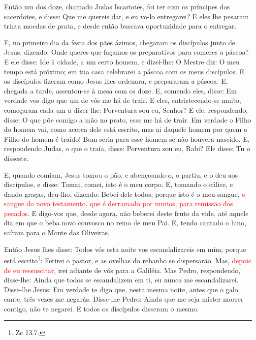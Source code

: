 Então um dos doze, chamado Judas Iscariotes, foi ter com os
príncipes dos sacerdotes, e disse: Que me quereis dar, e eu
vo-lo entregarei? E eles lhe pesaram trinta moedas de prata,
e desde então buscava oportunidade para o entregar.

E, no primeiro dia da festa dos pães ázimos, chegaram os
discípulos junto de Jesus, dizendo: Onde queres que façamos os
preparativos para comeres a páscoa? E ele disse: Ide à
cidade, a um certo homem, e dizei-lhe: O Mestre diz: O meu tempo
está próximo; em tua casa celebrarei a páscoa com os meus
discípulos. E os discípulos fizeram como Jesus lhes ordenara,
e prepararam a páscoa. E, chegada a tarde, assentou-se à mesa
com os doze. E, comendo eles, disse: Em verdade vos digo que
um de vós me há de trair. E eles, entristecendo-se muito,
começaram cada um a dizer-lhe: Porventura sou eu, Senhor? E
ele, respondendo, disse: O que põe comigo a mão no prato, esse me há
de trair. Em verdade o Filho do homem vai, como acerca dele
está escrito, mas ai daquele homem por quem o Filho do homem é
traído! Bom seria para esse homem se não houvera nascido. E,
respondendo Judas, o que o traía, disse: Porventura sou eu, Rabi?
Ele disse: Tu o disseste.

E, quando comiam, Jesus tomou o pão, e abençoando-o, o partiu, e
o deu aos discípulos, e disse: Tomai, comei, isto é o meu corpo.
E, tomando o cálice, e dando graças, deu-lho, dizendo: Bebei
dele todos; porque isto é o meu sangue, \textcolor{red}{o sangue do
novo testamento, que é derramado por muitos, para remissão dos
pecados}. E digo-vos que, desde agora, não beberei deste
fruto da vide, até aquele dia em que o beba novo convosco no reino
de meu Pai. E, tendo cantado o hino, saíram para o Monte das
Oliveiras.

Então Jesus lhes disse: Todos vós esta noite vos escandalizareis
em mim; porque está escrito\footnote{Zc 13.7.}: Ferirei o pastor, e
as ovelhas do rebanho se dispersarão. Mas, \textcolor{red}{depois de
eu ressuscitar}, irei adiante de vós para a Galiléia. Mas
Pedro, respondendo, disse-lhe: Ainda que todos se escandalizem em
ti, eu nunca me escandalizarei. Disse-lhe Jesus: Em verdade
te digo que, nesta mesma noite, antes que o galo cante, três vezes
me negarás. Disse-lhe Pedro: Ainda que me seja mister morrer
contigo, não te negarei. E todos os discípulos disseram o mesmo.

